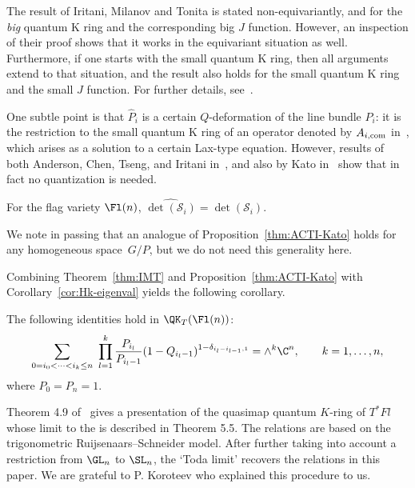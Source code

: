 \begin{Remark}
The result of Iritani, Milanov and Tonita is stated non-equivariantly, and for the
{\em big} quantum K ring and the corresponding big $J$ function. However, an inspection of their proof shows that it works in the equivariant situation as well.
Furthermore, if one starts with the small quantum K ring, then all arguments extend
to that situation, and the result also holds for the small quantum K ring and the small $J$ function. For further details, see~\cite{huq2024relations}.
\end{Remark}
One subtle point is that $\widehat{P}_i$ is a certain $Q$-deformation
of the line bundle $P_i$: it is the restriction to the small
quantum K ring
of an operator denoted by
$A_{i,{\rm com}}$ in~\cite[Corollary~2.9]{Iritani:2013qka}, which
arises as a solution to a certain Lax-type equation.
However, results of both Anderson, Chen, Tseng, and Iritani
in~\cite[Lemma~6]{anderson2022finite}, and also
by Kato in~\cite[Theorem~1.35]{kato:loop}
show that in fact no quantization is needed.

\begin{Proposition}\label{thm:ACTI-Kato} For the flag variety $\Fl(n)$,
$\widehat{\det(\mathcal{S}_i)}=\det(\mathcal{S}_i)$.
\end{Proposition}
We note in passing that an analogue of Proposition~\ref{thm:ACTI-Kato} holds for any homogeneous
space~$G/P$, but we do not need this generality here.

Combining Theorem~\ref{thm:IMT} and Proposition~\ref{thm:ACTI-Kato} with Corollary~\ref{cor:Hk-eigenval}
yields the following corollary.
\begin{Corollary}%
The following identities hold
in $\QK_T(\Fl(n))$:
\begin{equation*}
 \sum_{0= i_0<\dots<i_k\leq n}\ \prod_{l=1}^{k}\frac{P_{i_l}}{P_{i_{l}-1}}(1-Q_{i_l-1})^{1-\delta_{i_l-i_{l-1},1}}=\wedge^k \C^n,\qquad k=1,\dots,n,
\end{equation*}
where $P_0=P_n=1$.
\end{Corollary}

\begin{Remark}
Theorem 4.9 of~\cite{koroteev} gives a presentation of the quasimap quantum $K$-ring of $T^*Fl$ whose limit to the is described in Theorem 5.5. The relations are based on the trigonometric Ruijsenaars--Schneider model. After further taking into account a restriction from $\GL_n$ to $\SL_n$, the `Toda limit' recovers the relations in this paper. We are grateful to P. Koroteev who explained this procedure to us.
\end{Remark}


